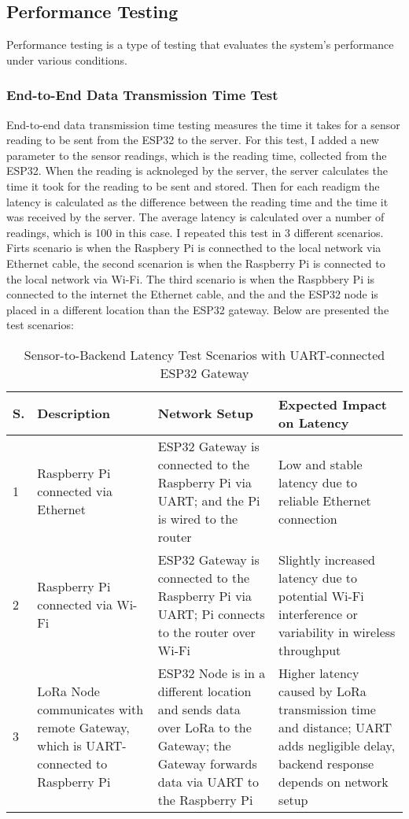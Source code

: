 \subsection{Performance Testing}
Performance testing is a type of testing that evaluates the system's performance under various conditions.
\subsubsection{End-to-End Data Transmission Time Test}
End-to-end data transmission time testing measures the time it takes for a sensor reading to be sent from the ESP32 to the server.
For this test, I added a new parameter to the sensor readings, which is the reading time, collected from the ESP32. When the reading is acknoleged 
by the server, the server calculates the time it took for the reading to be sent and stored. Then for each readigm the latency is calculated as
the difference between the reading time and the time it was received by the server.
The average latency is calculated over a number of readings, which is 100 in this case. 
I repeated this test in 3 different scenarios. Firts scenario is when the Raspbery Pi is connecthed to the local network via Ethernet cable,
the second scenarion is when the Raspberry Pi is connected to the local network via Wi-Fi. The third scenario is when the Raspbbery Pi is connected to the internet
the Ethernet cable, and the and the ESP32 node is placed in a different location than the ESP32 gateway. 
Below are presented the test scenarios:
\begin{table}[H]
\centering
\begin{tabular}{|p{1.2cm}|p{5cm}|p{5cm}|p{5cm}|}
\hline
\textbf{S.} & \textbf{Description} & \textbf{Network Setup} & \textbf{Expected Impact on Latency} \\
\hline
1 & Raspberry Pi connected via Ethernet & ESP32 Gateway is connected to the Raspberry Pi via UART; and the Pi is wired to the router & Low and stable latency due to reliable Ethernet connection \\
\hline
2 & Raspberry Pi connected via Wi-Fi & ESP32 Gateway is connected to the Raspberry Pi via UART; Pi connects to the router over Wi-Fi & Slightly increased latency due to potential Wi-Fi interference or variability in wireless throughput \\
\hline
3 & LoRa Node communicates with remote Gateway, which is UART-connected to Raspberry Pi & ESP32 Node is in a different location and sends data over LoRa to the Gateway; the Gateway forwards data via UART to the Raspberry Pi & Higher latency caused by LoRa transmission time and distance; UART adds negligible delay, backend response depends on network setup \\
\hline
\end{tabular}
\caption{Sensor-to-Backend Latency Test Scenarios with UART-connected ESP32 Gateway}
\label{tab:latency_scenarios_uart}
\end{table}

